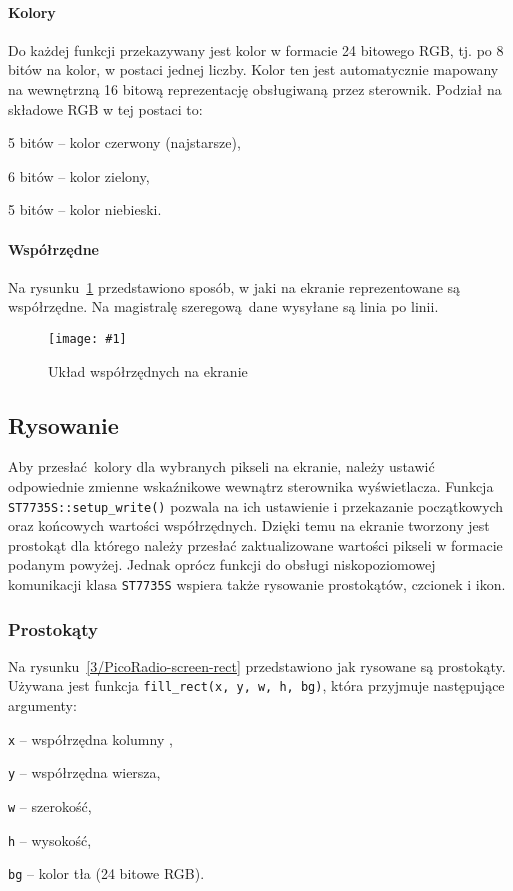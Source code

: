 \documentclass[polish]{aghengthesis}
\let\tempone\itemize
\let\temptwo\enditemize
\renewenvironment{itemize}{\tempone\setlength{\itemsep}{0cm}}{\temptwo}
\newcommand{\imgint}[4]{
	\begin{figure}[{#4}]
		\centering
		\texttt{[image: \#1]}
		\caption{#2}
		\label{#1}
	\end{figure}
}
\newcommand{\imgh}[3]{\imgint{#1}{#2}{#3}{H}}
\begin{document}
		\paragraph{Kolory}
			Do każdej funkcji przekazywany jest kolor w formacie 24 bitowego RGB, tj. po 8 bitów na kolor, w postaci jednej liczby. Kolor ten jest automatycznie mapowany na wewnętrzną 16 bitową reprezentację obsługiwaną przez sterownik. Podział na składowe RGB w tej postaci to:
			\begin{itemize}
				\item 5 bitów -- kolor czerwony (najstarsze),
				\item 6 bitów -- kolor zielony,
				\item 5 bitów -- kolor niebieski.
			\end{itemize}
		
		\paragraph{Współrzędne}
			Na rysunku~\ref{3/PicoRadio-screen-xy} przedstawiono sposób, w jaki na ekranie reprezentowane są współrzędne. Na magistralę szeregową dane wysyłane są linia po linii.
			
		\imgh{3/PicoRadio-screen-xy}{Układ współrzędnych na ekranie}{0.45}
		
		\subsection{Rysowanie}
			Aby przesłać kolory dla wybranych pikseli na ekranie, należy ustawić odpowiednie zmienne wskaźnikowe wewnątrz sterownika wyświetlacza. Funkcja \lstinline|ST7735S::setup_write()| pozwala na ich ustawienie i przekazanie początkowych oraz końcowych wartości współrzędnych. Dzięki temu na ekranie tworzony jest prostokąt dla którego należy przesłać zaktualizowane wartości pikseli w formacie podanym powyżej. Jednak oprócz funkcji do obsługi niskopoziomowej komunikacji klasa \lstinline|ST7735S|  wspiera także rysowanie prostokątów, czcionek i ikon.
			
			\subsubsection{Prostokąty}
				Na rysunku~\ref{3/PicoRadio-screen-rect} przedstawiono jak rysowane są prostokąty. Używana jest funkcja \lstinline|fill_rect(x, y, w, h, bg)|, która przyjmuje następujące argumenty:
				\begin{itemize}
					\item \lstinline|x| -- współrzędna kolumny ,
					\item \lstinline|y| -- współrzędna wiersza,
					\item \lstinline|w| -- szerokość,
					\item \lstinline|h| -- wysokość,
					\item \lstinline|bg| -- kolor tła (24 bitowe RGB).
				\end{itemize}
				
\end{document}
